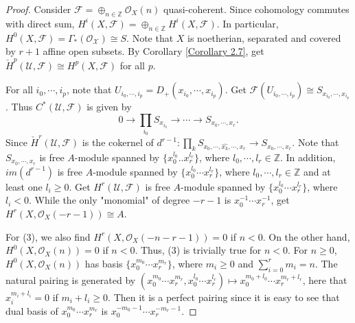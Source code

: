 \documentclass{ctexart}
\begin{document}
\begin{proof}
    Consider $\mathcal{F} = \oplus_{n\in \mathbb{Z}} \mathcal{O}_{X}(n)$ quasi-coherent.
    Since cohomology commutes with direct sum, $H^{i}(X, \mathcal{F}) = \oplus_{n\in \mathbb{Z}} H^{i}(X, \mathcal{F})$.
    In particular, $H^{0}(X, \mathcal{F}) = \Gamma_{\ast}(\mathcal{O_{X}}) \cong S$.
    Note that $X$ is noetherian, separated and covered by $r + 1$ affine open subsets.
    By Corollary \ref{Corollary 2.7}, get $\check{H}^{p}(\mathcal{U}, \mathcal{F}) \cong H^{p}(X, \mathcal{F})$ for all $p$.
    \par
    For all $i_{0}, \cdots, i_{p}$, note that $U_{i_{0}, \cdots, i_{p}} = D_{+}(x_{i_{0}}, \cdots, x_{i_{p}})$.
    Get $\mathcal{F}(U_{i_{0}, \cdots, i_{p}}) \cong S_{x_{i_{0}}, \cdots, x_{i_{p}}}$. 
    Thus $C^{\ast}(\mathcal{U}, \mathcal{F})$ is given by 
    \begin{equation}
        0 \longrightarrow \prod_{i_{0}} S_{x_{i_{0}}} \longrightarrow \cdots \longrightarrow S_{x_{0}, \cdots, x_{r}}.
    \end{equation}
    Since $\check{H}^{r}(\mathcal{U}, \mathcal{F})$ is the cokernel of $d^{r - 1}: \prod_{k} S_{x_{0}, \cdots, \widehat{x_{k}}, \cdots, x_{r}} \longrightarrow S_{x_{0}, \cdots, x_{r}}$.
    Note that $S_{x_{0}, \cdots, x_{r}}$ is free $A$-module spanned by $\{x_{0}^{l_{0}}..x_{r}^{l_{r}}\}$, where $l_{0}, \cdots, l_{r}\in \mathbb{Z}$.
    In addition, $im(d^{r - 1})$ is free $A$-module spanned by $\{x_{0}^{l_{0}}\cdots x_{r}^{l_{r}}\}$, where $l_{0}, \cdots, l_{r}\in \mathbb{Z}$ and at least one $l_{i} \ge 0$.
    Get $H^{r}(\mathcal{U}, \mathcal{F})$ is free $A$-module spanned by $\{x_{0}^{l_{0}}\cdots x_{r}^{l_{r}}\}$, where $l_{i} < 0$.
    While the only "monomial" of degree $-r - 1$ is $x_{0}^{-1}\cdots x_{r}^{-1}$, get $H^{r}(X, \mathcal{O}_{X}(-r - 1)) \cong A$.
    \par
    For (3), we also find $H^{r}(X, \mathcal{O}_{X}(-n - r - 1)) = 0$ if $n < 0$.
    On the other hand, $H^{0}(X, \mathcal{O}_{X}(n)) = 0$ if $n < 0$.
    Thus, (3) is trivially true for $n < 0$.
    For $n \ge 0$, $H^{0}(X, \mathcal{O}_{X}(n))$ has basis $\{x_{0}^{{m_{0}}}\cdots x_{r}^{m_{r}}\}$,
    where $m_{i} \ge 0$ and $\sum_{i = 0}^{r} m_{i} = n$.
    The natural pairing is generated by $(x_{0}^{m_{0}}\cdots x_{r}^{m_{r}}, x_{0}^{l_{0}}\cdots x_{r}^{l_{r}}) \longmapsto x_{0}^{m_{0} + l_{0}}\cdots x_{r}^{m_{r} + l_{r}}$,
    here that $x_{i}^{m_{i} + l_{i}} = 0$ if $m_{i} + l_{i} \ge 0$.
    Then it is a perfect pairing since it is easy to see that dual basis of $x_{0}^{m_{0}}\cdots x_{r}^{m_{r}}$ is $x_{0}^{-m_{0} - 1}\cdots x_{r}^{-m_{r} - 1}$.

\end{proof}
\end{document}
